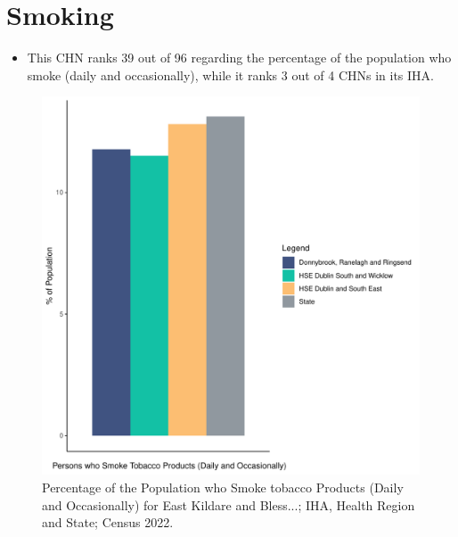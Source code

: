 \documentclass{article}
\begin{document}
\pagebreak

\section{Smoking}\label{sect:Smoking}
\begin{itemize}
\item This CHN ranks  39 out of 96 regarding the percentage of the population who smoke (daily and occasionally), while it ranks   3 out of 4 CHNs in its IHA.
\end{itemize}
\begin{figure}[H]
	\centering
	\includegraphics[width = 120mm]{../figures/SmokingED.pdf}
	\caption{Percentage of the Population who Smoke tobacco Products (Daily and Occasionally) for East Kildare and Bless...; IHA, Health Region and State; Census 2022.}
	\label{fig:2ae19629-1a6a-13a3-e055-000000000001}
	\end{figure}
	
\end{document}
